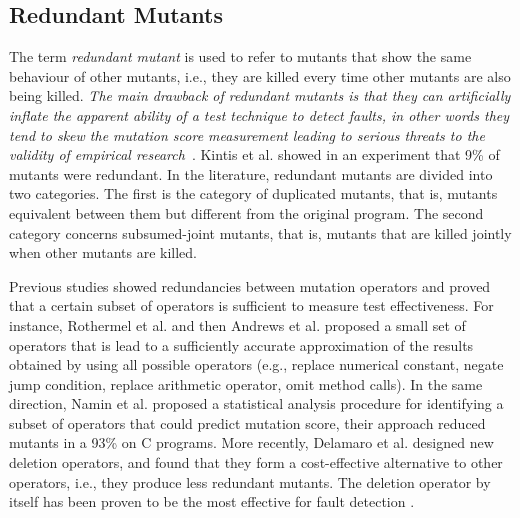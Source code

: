 
\subsection{Redundant Mutants}
\label{sec:opt:redundant}

The term \emph{redundant mutant} is used to refer to mutants that show the same behaviour of other mutants, i.e., they
are killed every time other mutants are also being killed. 
\emph{The main drawback of redundant mutants is that they can artificially inflate the apparent ability of a test technique to detect faults, in other words they tend to skew the mutation score measurement leading to serious threats to the validity of empirical research}~\cite{papadakis2016threats}.
Kintis et al. \cite{kintis2010evaluating} showed in an experiment that 9\% of mutants were redundant. In the literature, redundant mutants are divided into two categories. The first is the category of duplicated mutants, that is, mutants equivalent between them but different from the original program. The second category concerns subsumed-joint mutants, that is, mutants that are killed jointly when other mutants are killed.

Previous studies showed redundancies between mutation operators and proved that a certain subset of operators is sufficient to measure test effectiveness. For instance, Rothermel et al. \cite{rothermel1996experimental} and then Andrews et al. \cite{andrews2005mutation} proposed a small set of operators that is lead to a sufficiently accurate approximation of the results obtained by using all possible operators (e.g., replace numerical constant, negate jump condition, replace arithmetic operator, omit method calls). In the same direction, Namin et al. \cite{siami2008sufficient} proposed a statistical analysis procedure for identifying a subset of operators that could predict mutation score, their approach reduced mutants in a 93\% on C programs. 
More recently, Delamaro et al. \cite{delamaro2014designing} designed new deletion operators, and found that they form a cost-effective alternative to other operators, i.e., they produce less redundant mutants. The deletion operator by itself has been proven to be the most effective for fault detection \cite{delamaro2014designing}.

